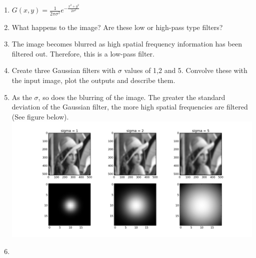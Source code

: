\documentclass[12pt,english]{scrartcl}
\begin{document}
\begin{enumerate}
 \item[]
 \centering
 $G(x,y) = \frac{1}{2\pi\sigma^2} e^{-\frac{x^2+y^2}{2\sigma^2}}$ \\
 \raggedright
 
 \item What happens to the image? Are these low or high-pass type filters? \\
 \item[]
 \color{blue}
 The image becomes blurred as high spatial frequency information has been filtered out. Therefore, this is a low-pass filter. 
 \color{black} 
 
 \item  Create three Gaussian filters with $\sigma$ values of 1,2 and 5. Convolve these with the input image, plot the outputs and describe them. \\
 \color{blue}
 \item[]
 As the $\sigma$, so does the blurring of the image. The greater the standard deviation of the Gaussian filter, the more high spatial frequencies are filtered (See figure below). \\
 \includegraphics[scale=0.4]{../Figures/Edge_detection/Answer_T1_2.png} 
 \item[]
 

\end{enumerate}
\end{document}
